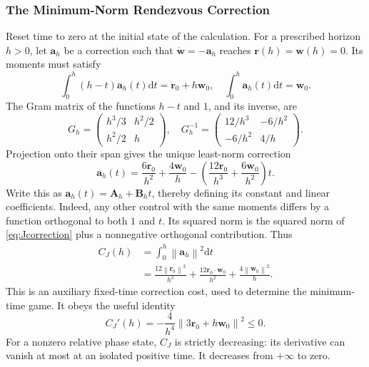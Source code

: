 \documentclass[journal,a4paper]{IEEEtran}
\newcommand{\norm}[1]{\left\|#1\right\|}
\newcommand{\dd}{\mathrm d}
\begin{document}
\subsubsection{The Minimum-Norm Rendezvous Correction}
Reset time to zero at the initial state of the calculation. For a prescribed horizon $h>0$, let $\mathbf a_h$ be a correction such that $\dot{\mathbf w}=-\mathbf a_h$ reaches $\mathbf r(h)=\mathbf w(h)=0$. Its moments must satisfy
\begin{equation}
 \int_0^h(h-t)\mathbf a_h(t)\dd t=\mathbf r_0+h\mathbf w_0,
 \quad \int_0^h\mathbf a_h(t)\dd t=\mathbf w_0.
 \label{eq:Jmoments}
\end{equation}
The Gram matrix of the functions $h-t$ and $1$, and its inverse, are
\begin{equation}
 G_h=\begin{pmatrix}h^3/3&h^2/2\\h^2/2&h\end{pmatrix},\quad
 G_h^{-1}=\begin{pmatrix}12/h^3&-6/h^2\\-6/h^2&4/h\end{pmatrix}.
 \label{eq:Jgramian}
\end{equation}
Projection onto their span gives the unique least-norm correction
\begin{equation}
 \boxed{\mathbf a_h(t)=\frac{6\mathbf r_0}{h^2}+\frac{4\mathbf w_0}{h}
 -\left(\frac{12\mathbf r_0}{h^3}+\frac{6\mathbf w_0}{h^2}\right)t.}
 \label{eq:Jcorrection}
\end{equation}
Write this as $\mathbf a_h(t)=\mathbf A_h+\mathbf B_ht$, thereby defining its constant and linear coefficients.
Indeed, any other control with the same moments differs by a function orthogonal to both $1$ and $t$. Its squared norm is the squared norm of \eqref{eq:Jcorrection} plus a nonnegative orthogonal contribution. Thus
\begin{equation}
 \boxed{\begin{aligned}
 C_J(h)&=\int_0^h\norm{\mathbf a_h}^2\dd t\\
 &=\frac{12\norm{\mathbf r_0}^2}{h^3}
  +\frac{12\mathbf r_0\cdot\mathbf w_0}{h^2}
  +\frac{4\norm{\mathbf w_0}^2}{h}.
 \end{aligned}}
 \label{eq:Jcost}
\end{equation}
This is an auxiliary fixed-time correction cost, used to determine the minimum-time game. It obeys the useful identity
\begin{equation}
 C_J'(h)=-\frac{4}{h^4}\norm{3\mathbf r_0+h\mathbf w_0}^2\le0.
 \label{eq:Jmonotone}
\end{equation}
For a nonzero relative phase state, $C_J$ is strictly decreasing: its derivative can vanish at most at an isolated positive time. It decreases from $+\infty$ to zero.
\end{document}
